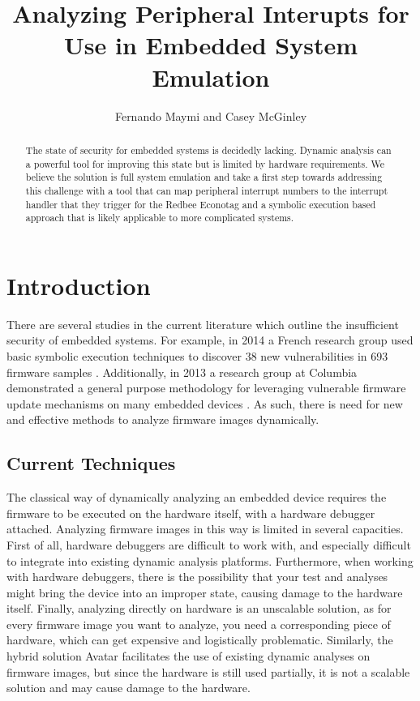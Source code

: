 \documentclass[letterpaper, 10 pt, conference]{ieeeconf}
\title{\LARGE \bf
Analyzing Peripheral Interupts for Use in Embedded System Emulation
}
\author{Fernando Maymi and Casey McGinley}
\begin{document}
\maketitle
\thispagestyle{empty}
\pagestyle{empty}

\begin{abstract}
The state of security for embedded systems is decidedly lacking. Dynamic analysis can a powerful tool for improving this state but is limited by hardware requirements. We believe the solution is full system emulation and take a first step towards addressing this challenge with a tool that can map peripheral interrupt numbers to the interrupt handler that they trigger for the Redbee Econotag and a symbolic execution based approach that is likely applicable to more complicated systems.
\end{abstract}

\section{Introduction}
There are several studies in the current literature which outline the insufficient security of embedded systems. For example, in 2014 a French research group used basic symbolic execution techniques to discover 38 new vulnerabilities in 693 firmware samples \cite{acostin}. Additionally, in 2013 a research group at Columbia demonstrated a general purpose methodology for leveraging vulnerable firmware update mechanisms on many embedded devices \cite{acui}. As such, there is need for new and effective methods to analyze firmware images dynamically.

\subsection{Current Techniques}
The classical way of dynamically analyzing an embedded device requires the firmware to be executed on the hardware itself, with a hardware debugger attached. Analyzing firmware images in this way is limited in several capacities. First of all, hardware debuggers are difficult to work with, and especially difficult to integrate into existing dynamic analysis platforms. Furthermore, when working with hardware debuggers, there is the possibility that your test and analyses might bring the device into an improper state, causing damage to the hardware itself. Finally, analyzing directly on hardware is an unscalable solution, as for every firmware image you want to analyze, you need a corresponding piece of hardware, which can get expensive and logistically problematic. Similarly, the hybrid solution Avatar \cite{avatar} facilitates the use of existing dynamic analyses on firmware images, but since the hardware is still used partially, it is not a scalable solution and may cause damage to the hardware.
\end{document}

